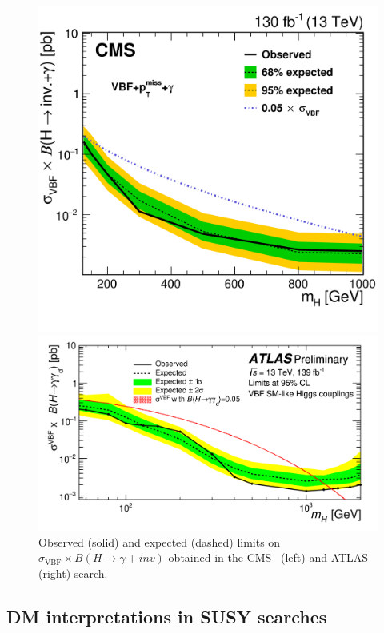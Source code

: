 \documentclass{moriond}
\begin{document}
\begin{figure} [htb]
\begin{minipage}{0.45\linewidth}
\centerline{\includegraphics[width=0.9\linewidth]{cmsvbf}}
\end{minipage}
\begin{minipage}{0.45\linewidth}
\centerline{\includegraphics[width=0.9\linewidth]{atlasvbf}}
\end{minipage}
\caption[]{Observed (solid) and expected (dashed) limits on $\sigma_{\textrm{VBF}}\times B(H\rightarrow\gamma+inv)$ obtained in the CMS~\cite{cmsvbf} (left) and ATLAS~\cite{atlasvbf} (right) search.}
\label{fig:vbf}
\end{figure}

\subsection{DM interpretations in SUSY searches}
\end{document}
